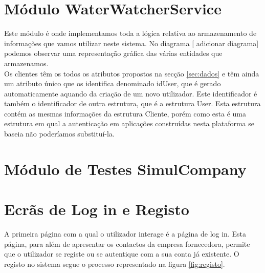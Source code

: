\section{Módulo WaterWatcherService} \label{modwws} %
Este módulo é onde implementamos toda a lógica relativa ao armazenamento de informações que vamos utilizar neste sistema. No diagrama [ adicionar diagrama] podemos observar uma representação gráfica das várias entidades que armazenamos.\\
Os clientes têm os todos os atributos propostos na secção \ref{sec:dados} e têm ainda um atributo único que os identifica denominado idUser, que é gerado automaticamente aquando da criação de um novo utilizador. Este identificador é também o identificador de outra estrutura, que é a estrutura User. Esta estrutura contém as mesmas informações da estrutura Cliente, porém como esta é uma estrutura em qual a autenticação em aplicações construídas nesta plataforma se baseia \cite{outs:users} não poderíamos substituí-la.

\section{Módulo de Testes SimulCompany} \label{modsc}

\section{Ecrãs de Log in e Registo} \label{ecra:login}
A primeira página com a qual o utilizador interage é a página de log in. Esta página, para além de apresentar os contactos da empresa fornecedora, permite que o utilizador se registe ou se autentique com a sua conta já existente.
O registo no sistema segue o processo representado na figura \ref{fig:registo}.

